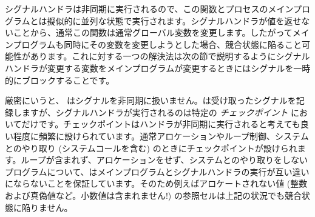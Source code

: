 シグナルハンドラは非同期に実行されるので、この関数とプロセスのメインプログラムとは擬似的に並列な状態で実行されます。シグナルハンドラが値を返せないことから、通常この関数は通常グローバル変数を変更します。したがってメインプログラムも同時にその変数を変更しようとした場合、競合状態に陥ること可能性があります。これに対する一つの解決法は次の節で説明するようにシグナルハンドラが変更する変数をメインプログラムが変更するときにはシグナルを一時的にブロックすることです。

厳密にいうと、 \ocaml はシグナルを非同期に扱いません。\ocaml は受け取ったシグナルを記録しますが、シグナルハンドラが実行されるのは特定の \emph{チェックポイント} においてだけです。チェックポイントはハンドラが非同期に実行されると考えても良い程度に頻繁に設けられています。通常アロケーションやループ制御、システムとのやり取り (システムコールを含む) のときにチェックポイントが設けられます。ループが含まれず、アロケーションをせず、システムとのやり取りをしないプログラムについて、\ocaml はメインプログラムとシグナルハンドラの実行が互い違いにならないことを保証しています。そのため例えばアロケートされない値 (整数および真偽値など。小数値は含まれません!) の参照セルは上記の状況でも競合状態に陥りません。

